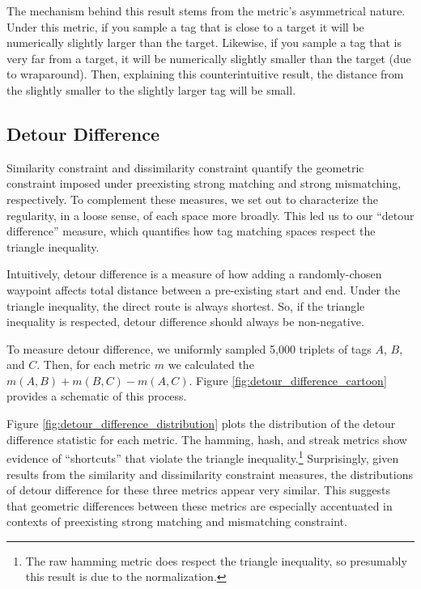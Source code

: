 The mechanism behind this result stems from the metric's asymmetrical nature.
Under this metric, if you sample a tag that is close to a target it will be numerically slightly larger than the target.
Likewise, if you sample a tag that is very far from a target, it will be numerically slightly smaller than the target (due to wraparound).
Then, explaining this counterintuitive result, the distance from the slightly smaller to the slightly larger tag will be small.

\subsection{Detour Difference} \label{sec:detour_difference}



Similarity constraint and dissimilarity constraint quantify the geometric constraint imposed under preexisting strong matching and strong mismatching, respectively.
To complement these measures, we set out to characterize the regularity, in a loose sense, of each space more broadly.
This led us to our ``detour difference'' measure, which quantifies how tag matching spaces respect the triangle inequality.

Intuitively, detour difference is a measure of how adding a randomly-chosen waypoint affects total distance between a pre-existing start and end.
Under the triangle inequality, the direct route is always shortest.
So, if the triangle inequality is respected, detour difference should always be non-negative.

To measure detour difference, we uniformly sampled 5,000 triplets of tags $A$, $B$, and $C$.
Then, for each metric $m$ we calculated the $m(A, B) + m(B, C) - m(A, C)$.
Figure \ref{fig:detour_difference_cartoon} provides a schematic of this process.

Figure \ref{fig:detour_difference_distribution} plots the distribution of the detour difference statistic for each metric.
The hamming, hash, and streak metrics show evidence of ``shortcuts'' that violate the triangle inequality.\footnote{
The raw hamming metric does respect the triangle inequality, so presumably this result is due to the normalization.
}
Surprisingly, given results from the similarity and dissimilarity constraint measures, the distributions of detour difference for these three metrics appear very similar.
This suggests that geometric differences between these metrics are especially accentuated in contexts of preexisting strong matching and mismatching constraint.
